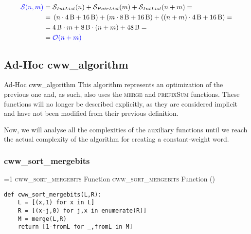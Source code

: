         \begin{frame}{\cwwviainsertionseriescostframe}
            \begin{align*}
                \textcolor{blue}{\mathcal{S}{\left(n , m\right)}} = & \; \mathcal{S}_{IntList}{\left(n\right)} + \mathcal{S}_{PairList}{\left(m\right)} + \mathcal{S}_{IntList}{\left(n + m\right)} = \\
                = & \; \left(n \cdot \SI{4}{B} + \SI{16}{B}\right) + \left(m \cdot \SI{8}{B} + \SI{16}{B}\right) + \left(\left(n + m\right) \cdot \SI{4}{B} + \SI{16}{B}\right) = \\
                = & \; \SI{4}{B} \cdot m + \SI{8}{B} \cdot \left(n + m\right) + \SI{48}{B} = \\
                = & \; \textcolor{blue}{\mathcal{O}{\left(n + m\right)}}
            \end{align*}
        \end{frame}        

    \subsection{Ad-Hoc cww\_algorithm}
        \begin{frame}{Ad-Hoc cww\_algorithm}
            This algorithm represents an optimization of the previous one and, as such, also uses the \textsc{merge} and \textsc{prefixSum} functions. These functions will no longer be described explicitly, as they are considered implicit and have not been modified from their previous definition.

            \leavevmode

            Now, we will analyse all the complexities of the auxiliary functions until we reach the actual complexity of the algorithm for creating a constant-weight word.
        \end{frame}

        \subsubsection{cww\_sort\_mergebits}
\setcounter{cwwsortmergebitsfunctioncounter}{1}
\newcommand{\cwwsortmergebitsfunctionframe}{%
    \ifnum\value{cwwsortmergebitsfunctioncounter}=1
        \textsc{cww\_sort\_mergebits} Function%
    \else
        \textsc{cww\_sort\_mergebits} Function (\thecwwsortmergebitsfunctioncounter)%
    \fi
}
            \begin{frame}[containsverbatim]{\cwwsortmergebitsfunctionframe}
                \begin{verbatim}
def cww_sort_mergebits(L,R):
    L = [(x,1) for x in L]
    R = [(x-j,0) for j,x in enumerate(R)]
    M = merge(L,R)
    return [1-fromL for _,fromL in M]
                    \end{verbatim}
            \end{frame}


